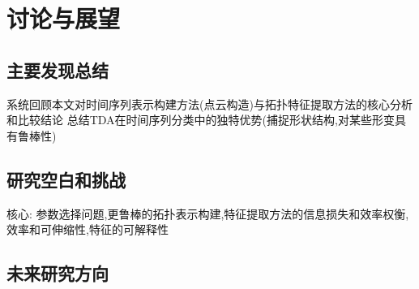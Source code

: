 \section{讨论与展望}
\subsection{主要发现总结}
系统回顾本文对时间序列表示构建方法(点云构造)与拓扑特征提取方法的核心分析和比较结论
总结TDA在时间序列分类中的独特优势(捕捉形状结构,对某些形变具有鲁棒性)

\subsection{研究空白和挑战}
核心: 参数选择问题,更鲁棒的拓扑表示构建,特征提取方法的信息损失和效率权衡,
效率和可伸缩性,特征的可解释性

\subsection{未来研究方向}
